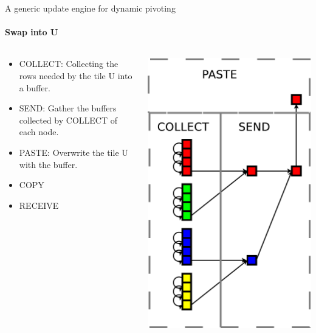 \begin{frame}{A generic update engine for dynamic pivoting}
\framesubtitle{Swap into U}
\begin{columns}
\begin{column}{.60\textwidth}
\begin{itemize}
\item COLLECT: Collecting the rows needed by the tile U into a buffer.
\item SEND: Gather the buffers collected by COLLECT of each node.
\item PASTE: Overwrite the tile U with the buffer.
\item COPY
\item RECEIVE
\end{itemize}
\end{column}
\hfill
\begin{column}{.40\textwidth}
\begin{center}
\includegraphics[scale=0.3]{collect.pdf}
\end{center}
\end{column}
\end{columns}
\end{frame}

